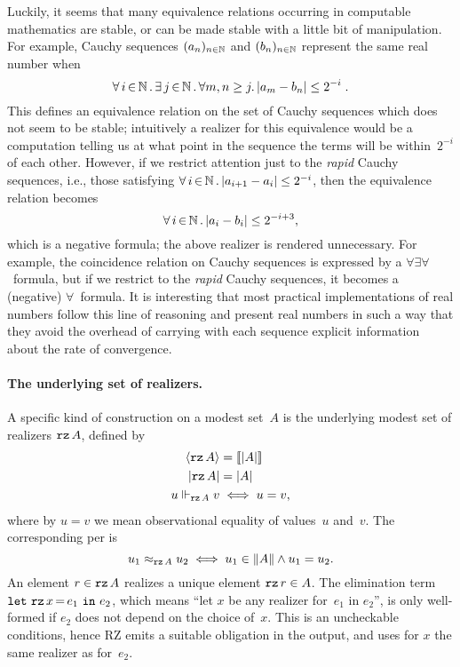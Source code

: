 Luckily, it seems that many equivalence relations occurring in
computable mathematics are stable, or can be made stable with a little
bit of manipulation.
%
\iflong
For example, Cauchy sequences $(a_n)_{n\in\mathbb{N}}$
and $(b_n)_{n\in\mathbb{N}}$ represent the same real number when
%
\begin{equation}
  \label{eq:cauchy}%
  \xall{i}{\NN}{
    \xsome{j}{\NN}{
      \forall m,n \geq j.\,|a_m - b_n| \leq 2^{-i}
    }
  } \;.
\end{equation}
%
This defines an equivalence relation on the set of Cauchy sequences
which does not seem to be stable; intuitively a realizer for this
equivalence would be a computation telling us at what point
in the sequence the terms will be within~$2^{-i}$ of each other.
%
However, if we restrict attention just to the \emph{rapid} Cauchy
sequences, i.e., those satisfying $\forall\, i \,{\in}\, \mathbb{N}\,.\,|a_{i+1} - a_i| \leq
  2^{-i}$, then the equivalence relation becomes
%
\begin{equation*}
  \forall\, i \,{\in}\, \mathbb{N}\,.\,|a_i - b_i| \leq 2^{-i+3},
\end{equation*}
%
which is a negative formula; the above realizer is rendered
unnecessary.
%
\else %
%
For example, the coincidence relation on Cauchy sequences is expressed
by a $\forall\exists\forall$~formula, but if we restrict to the
\emph{rapid} Cauchy sequences, it becomes a (negative)
$\forall$~formula.
%
\fi %
It is interesting that most practical implementations of
real numbers follow this line of reasoning and present real numbers in
such a way that they avoid the overhead of carrying with each sequence
explicit information about the rate of convergence.


\paragraph{The underlying set of realizers.}
%
A specific kind of construction on a modest set~$A$ is the underlying
modest set of realizers $\texttt{rz}\,A$, defined by
%
\begin{align*}
  \langle \texttt{rz}\,A \rangle &= [\![|A|]\!] \\
  |\texttt{rz}\,A| &= |A| \\
  u \Vdash_{\texttt{rz}\,A} v &\iff u = v,
\end{align*}
%
where by $u = v$ we mean observational equality of values~$u$ and~$v$.
The corresponding per is
%
\begin{equation*}
  u_1 \approx_{\texttt{rz}\,A} u_2 \iff u_1 \in \|A\| \land u_1 = u_2.
\end{equation*}
%
An element $r \in \texttt{rz}\,A$ realizes a unique element $\texttt{rz}\,r \in A$.
The elimination term $\texttt{let}\ \texttt{rz}\,x\,{=}\,e_1\ \texttt{in}\ e_2$, which means ``let $x$ be
any realizer for~$e_1$ in $e_2$'', is only well-formed if $e_2$ does
not depend on the choice of~$x$. This is an uncheckable conditions,
hence RZ emits a suitable obligation in the output, and uses for $x$
the same realizer as for~$e_2$.

